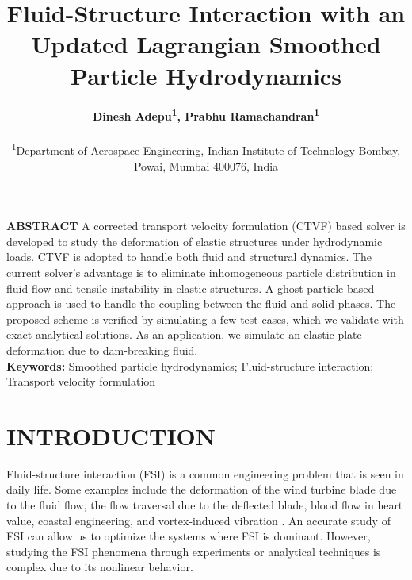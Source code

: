 \documentclass[10pt, conference]{FMFP2022}
\begin{document}
\title{\LARGE{ \bf Fluid-Structure Interaction with an Updated
    Lagrangian Smoothed Particle Hydrodynamics }}
\author{\textbf{Dinesh Adepu\textsuperscript{1}, Prabhu Ramachandran\textsuperscript{1}}\\\\
  \textsuperscript{1}\small{Department of Aerospace Engineering, Indian
    Institute of Technology Bombay, Powai, Mumbai 400076, India}}

\maketitle
\thispagestyle{fancy}
\pagestyle{plain} %

\noindent \textbf{ABSTRACT}
A corrected transport velocity formulation (CTVF) based solver is developed to
study the deformation of elastic structures under hydrodynamic loads. CTVF is
adopted to handle both fluid and structural dynamics. The current solver’s
advantage is to eliminate inhomogeneous particle distribution in fluid flow and
tensile instability in elastic structures. A ghost particle-based approach is
used to handle the coupling between the fluid and solid phases. The proposed
scheme is verified by simulating a few test cases, which we validate with exact
analytical solutions. As an application, we simulate an elastic plate
deformation due to dam-breaking fluid.\noindent\\
\textbf{Keywords:} Smoothed particle hydrodynamics; Fluid-structure interaction; Transport velocity formulation \\

\section{{\textbf{INTRODUCTION}}}
Fluid-structure interaction (FSI) is a common engineering problem that is seen
in daily life. Some examples include the deformation of the wind turbine blade
due to the fluid flow, the flow traversal due to the deflected blade, blood flow
in heart value, coastal engineering, and vortex-induced vibration
\cite{williamson2004vortex,bearman2011circular}. An accurate study of FSI can
allow us to optimize the systems where FSI is dominant. However, studying the
FSI phenomena through experiments or analytical techniques is complex due to its
nonlinear behavior. %
\end{document}
